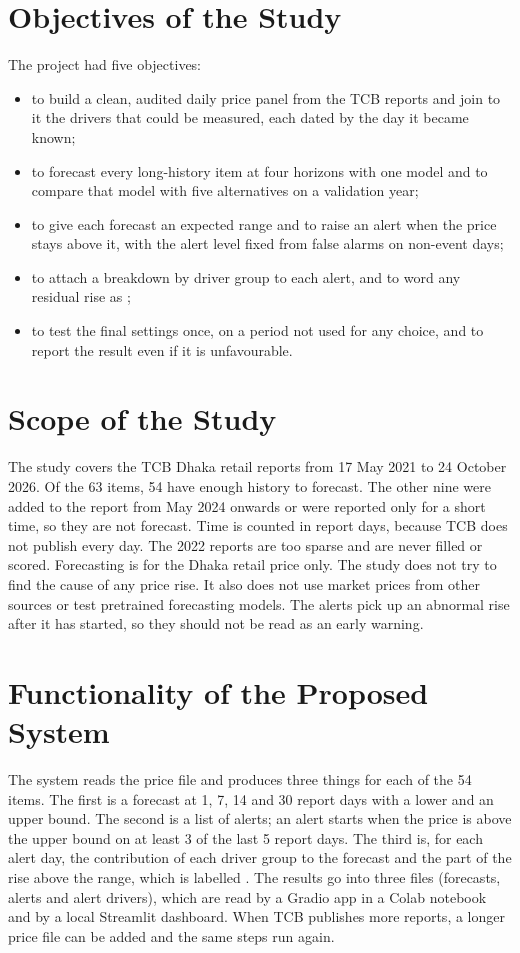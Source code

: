 \section{Objectives of the Study}
The project had five objectives:
\begin{itemize}
    \item to build a clean, audited daily price panel from the TCB reports and join to it the drivers that could be measured, each dated by the day it became known;
    \item to forecast every long-history item at four horizons with one model and to compare that model with five alternatives on a validation year;
    \item to give each forecast an expected range and to raise an alert when the price stays above it, with the alert level fixed from false alarms on non-event days;
    \item to attach a breakdown by driver group to each alert, and to word any residual rise as \unexpl;
    \item to test the final settings once, on a period not used for any choice, and to report the result even if it is unfavourable.
\end{itemize}

\section{Scope of the Study}
The study covers the TCB Dhaka retail reports from 17 May 2021 to 24 October 2026. Of the 63 items, 54 have enough history to forecast. The other nine were added to the report from May 2024 onwards or were reported only for a short time, so they are not forecast. Time is counted in report days, because TCB does not publish every day. The 2022 reports are too sparse and are never filled or scored. Forecasting is for the Dhaka retail price only. The study does not try to find the cause of any price rise. It also does not use market prices from other sources or test pretrained forecasting models. The alerts pick up an abnormal rise after it has started, so they should not be read as an early warning.

\section{Functionality of the Proposed System}
The system reads the price file and produces three things for each of the 54 items. The first is a forecast at 1, 7, 14 and 30 report days with a lower and an upper bound. The second is a list of alerts; an alert starts when the price is above the upper bound on at least 3 of the last 5 report days. The third is, for each alert day, the contribution of each driver group to the forecast and the part of the rise above the range, which is labelled \unexpl. The results go into three files (forecasts, alerts and alert drivers), which are read by a Gradio app in a Colab notebook and by a local Streamlit dashboard. When TCB publishes more reports, a longer price file can be added and the same steps run again.

